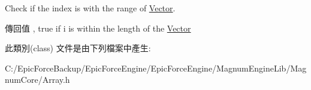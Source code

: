Check if the index is with the range of \hyperlink{class_magnum_1_1_vector}{Vector}. 

\begin{DoxyReturn}{傳回值}
, true if i is within the length of the \hyperlink{class_magnum_1_1_vector}{Vector} 
\end{DoxyReturn}


此類別(class) 文件是由下列檔案中產生\+:\begin{DoxyCompactItemize}
\item 
C\+:/\+Epic\+Force\+Backup/\+Epic\+Force\+Engine/\+Epic\+Force\+Engine/\+Magnum\+Engine\+Lib/\+Magnum\+Core/Array.\+h\end{DoxyCompactItemize}
